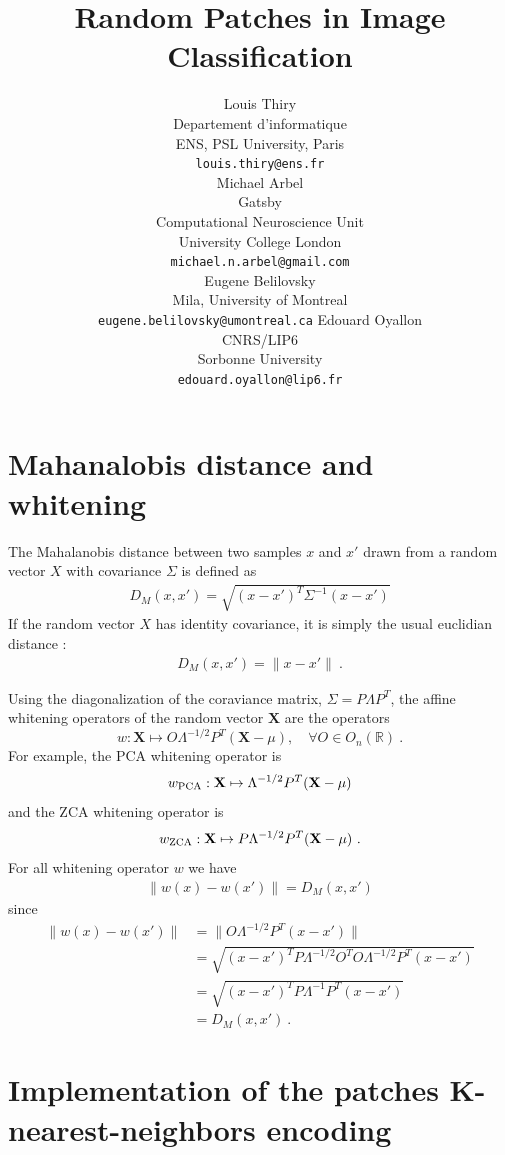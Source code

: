 \documentclass{article}
\title{Random Patches in Image Classification}
\author{%
  Louis Thiry \\
  Departement d'informatique \\
  ENS, PSL University, Paris\\
  \texttt{louis.thiry@ens.fr} \\
  \And
  Michael Arbel\\
  Gatsby\\
  Computational Neuroscience Unit\\
  University College London\\
  \texttt{michael.n.arbel@gmail.com}\\
  \And
    Eugene Belilovsky\\
  Mila, University of Montreal\\
  \texttt{eugene.belilovsky@umontreal.ca}
  \And
  Edouard Oyallon \\
  CNRS/LIP6 \\
  Sorbonne University \\
  \texttt{edouard.oyallon@lip6.fr} \\
}
\begin{document}
\appendix

\section{Mahanalobis distance and whitening}

The Mahalanobis distance \citep{chandra1936generalised, mclachlan1999mahalanobis} between two samples $x$ and $x'$ drawn from a random vector $X$ with covariance $\Sigma$ is defined as  
\begin{align*} D_M (x, x' ) =  \sqrt{ (x - x')^T \Sigma^{-1} (x - x')} \end{align*}
If the random vector $X$ has identity covariance, it is simply the usual euclidian distance : 
\begin{align*} D_M (x, x' ) =  \| x - x' \| \ .\end{align*}

Using the diagonalization of the coraviance matrix,  $\Sigma = P\Lambda P^T$, the affine whitening operators of the random vector $\mathbf{X}$ are the operators 
\begin{equation}
\label{whitening}
     w : \mathbf{X} \mapsto O \Lambda^{-1/2} P^T (\mathbf{X} - \mu), \quad \forall O \in  O_n (\mathbb{R}) \ .
\end{equation}
For example, the PCA whitening operator is 
\begin{equation*}
     w_{\rm PCA} : \mathbf{X} \mapsto \Lambda^{-1/2} P^T (\mathbf{X} - \mu)
\end{equation*}
and the ZCA whitening operator is 
\begin{equation*}
     w_{\rm ZCA} : \mathbf{X} \mapsto P \Lambda^{-1/2} P^T (\mathbf{X} - \mu) \ .
\end{equation*}
For all whitening operator $w$ we have
\begin{align*}
\|w(x) - w(x')\| = D_M(x, x')
\end{align*}
since
\begin{align*}
  \|w(x) - w(x')\|
    &= \| O \Lambda^{-1/2} P^T ( x - x') \|\\
    &= \sqrt{(x - x')^T P \Lambda^{-1/2} O^T O \Lambda^{-1/2} P^T (x - x') }\\
    &=  \sqrt{ (x - x')^T P \Lambda^{-1} P^T (x - x')} \\
    &= D_M(x, x') \ .
\end{align*}

\section{Implementation of the patches K-nearest-neighbors  encoding}
\end{document}
